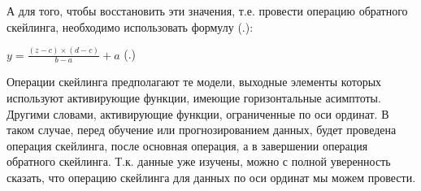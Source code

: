 {  \par \redline А для того, чтобы восстановить эти значения, т.е. провести операцию обратного скейлинга, необходимо использовать формулу (\thechaptercntr .\theformulacntr): 

  \formulaspace \par \redline 
    $y = \frac{\left(z - c\right) \times \left(d - c\right)}{b - a} + a$
    \hfill (\thechaptercntr .\theformulacntr) \redline
  \formulaspace \addtocounter{formulacntr}{1}

  \par \redline Операции скейлинга предполагают те модели, выходные элементы которых используют активирующие функции, имеющие горизонтальные асимптоты. Другими словами, активирующие функции, ограниченные по оси ординат. В таком случае, перед обучение или прогнозированием данных, будет проведена операция скейлинга, после основная операция, а в завершении операция обратного скейлинга. Т.к. данные уже изучены, можно с полной уверенность сказать, что операцию скейлинга для данных по оси ординат мы можем провести. 

  \par
}

\setcounter{subchaptercntr}{1}
\setcounter{formulacntr}{1}
\setcounter{imagecntr}{1}
\setcounter{tablecntr}{1}
